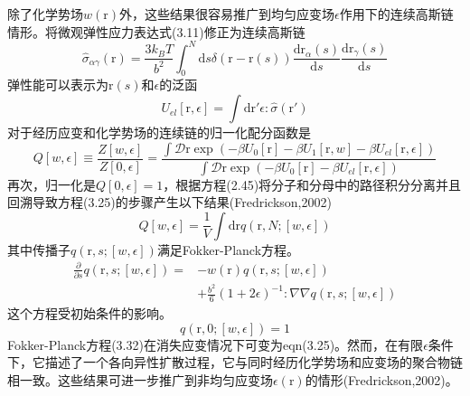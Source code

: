 除了化学势场$w(\mathrm{r})$外，这些结果很容易推广到均匀应变场$\epsilon$作用下的连续高斯链情形。将微观弹性应力表达式(3.11)修正为连续高斯链
\begin{equation}
\hat{\sigma}_{\alpha\gamma}(\mathrm{r})=\frac{3k_BT}{b^2}\int_0^N\mathrm{d}s\delta(\mathrm{r}-\mathrm{r}(s))\frac{\mathrm{d}\mathrm{r}_{\alpha}(s)}{\mathrm{d}s}\frac{\mathrm{d}\mathrm{r}_{\gamma}(s)}{\mathrm{d}s}
\end{equation}
弹性能可以表示为$\mathrm{r}(s)$和$\epsilon$的泛函
\begin{equation}
U_{el}[\mathrm{r},\epsilon]=\int\mathrm{d}\mathrm{r}'\epsilon:\hat{\sigma}(\mathrm{r}')
\end{equation}
对于经历应变和化学势场的连续链的归一化配分函数是
\begin{equation}
Q[w,\epsilon]\equiv\frac{Z[w,\epsilon]}{Z[0,\epsilon]}=\frac{\int\mathcal{D}\mathrm{r}\exp(-\beta U_0[\mathrm{r}]-\beta U_1[\mathrm{r},w]-\beta U_{el}[\mathrm{r},\epsilon])}{\int\mathcal{D}\mathrm{r}\exp(-\beta U_0[\mathrm{r}]-\beta U_{el}[\mathrm{r},\epsilon])}
\end{equation}
再次，归一化是$Q[0,\epsilon]=1$，根据方程(2.45)将分子和分母中的路径积分分离并且回溯导致方程(3.25)的步骤产生以下结果(Fredrickson,2002)
\begin{equation}
Q[w,\epsilon]=\frac{1}{V}\int\mathrm{d}\mathrm{r}q(\mathrm{r},N;[w,\epsilon])
\end{equation}
其中传播子$q(\mathrm{r},s;[w,\epsilon])$满足Fokker-Planck方程。
\begin{equation}
\begin{aligned}
\frac{\partial}{\partial s}q(\mathrm{r},s;[w,\epsilon])=&-w(\mathrm{r})q(\mathrm{r},s;[w,\epsilon])\\
&+\frac{b^2}{6}(1+2\epsilon)^{-1}:\nabla\nabla q(\mathrm{r},s;[w,\epsilon])
\end{aligned}
\end{equation}
这个方程受初始条件的影响。
\begin{equation}
q(\mathrm{r},0;[w,\epsilon])=1
\end{equation}
Fokker-Planck方程(3.32)在消失应变情况下可变为eqn(3.25)。然而，在有限$\epsilon$条件下，它描述了一个各向异性扩散过程，它与同时经历化学势场和应变场的聚合物链相一致。这些结果可进一步推广到非均匀应变场$\epsilon(\mathrm{r})$的情形(Fredrickson,2002)。

